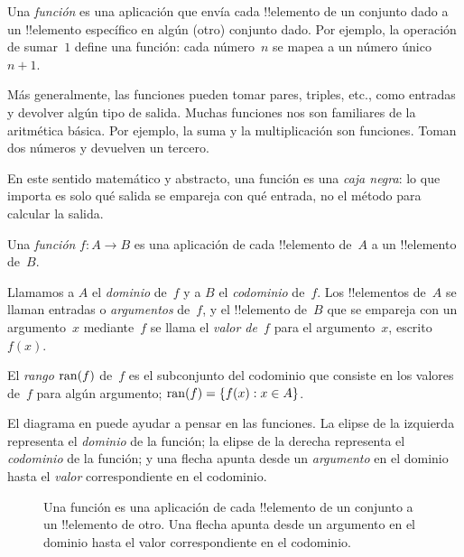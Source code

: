 \documentclass[../../../include/open-logic-section]{subfiles}
\begin{document}

\begin{explain}
Una \emph{función} es una aplicación que envía cada !!{elemento} de un conjunto dado a un !!{elemento} específico en algún (otro) conjunto dado. Por ejemplo, la operación de sumar~$1$ define una función: cada número~$n$ se mapea a un número único~$n+1$.
  
Más generalmente, las funciones pueden tomar pares, triples, etc., como entradas y devolver algún tipo de salida. Muchas funciones nos son familiares de la aritmética básica. Por ejemplo, la suma y la multiplicación son funciones. Toman dos números y devuelven un tercero.

En este sentido matemático y abstracto, una función es una \emph{caja negra}: lo que importa es solo qué salida se empareja con qué entrada, no el método para calcular la salida.
\end{explain}

\begin{defn}[Función]
Una \emph{función} $f \colon A \to B$ es una aplicación de cada !!{elemento} de~$A$ a un !!{elemento} de~$B$.

Llamamos a $A$ el \emph{dominio} de~$f$ y a $B$ el \emph{codominio} de~$f$. Los !!{elementos} de~$A$ se llaman entradas o \emph{argumentos} de~$f$, y el !!{elemento} de~$B$ que se empareja con un argumento~$x$ mediante~$f$ se llama el \emph{valor de~$f$} para el argumento~$x$, escrito~$f(x)$.

El \emph{rango} $\mathrm{ran}(f)$ de~$f$ es el subconjunto del codominio que consiste en los valores de~$f$ para algún argumento; $\mathrm{ran}(f) = \{ f(x) : x \in A \}$.
\end{defn}

El diagrama en  puede ayudar a pensar en las funciones. La elipse de la izquierda representa el \emph{dominio} de la función; la elipse de la derecha representa el \emph{codominio} de la función; y una flecha apunta desde un \emph{argumento} en el dominio hasta el \emph{valor} correspondiente en el codominio.

\begin{figure}
  \caption{Una función es una aplicación de cada !!{elemento} de un conjunto a un !!{elemento} de otro. Una flecha apunta desde un argumento en el dominio hasta el valor correspondiente en el codominio.}
\end{figure}
\end{document}
